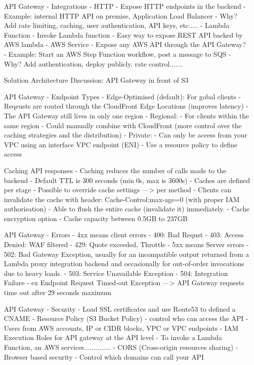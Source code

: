 API Gateway - Integrations
- HTTP
- Expose HTTP endpoints in the backend
- Example: internal HTTP API on premise, Application Load Balancer
- Why? Add rate limiting, caching, user authentication, API keys, etc.....
- Lambda Function
- Invoke Lambda function
- Easy way to expose REST API backed by AWS lambda
- AWS Service
- Expose any AWS API through the API Gateway?
- Example: Start an AWS Step Function workflow, post a message to SQS
- Why? Add authentication, deploy publicly. rate control.......

Solution Architecture Discussion: API Gateway in front of S3

API Gateway - Endpoint Types
- Edge-Optimised (default): For gobal clients
- Reqeusts are routed through the CloudFront Edge Locations (improves latency)
- The API Gateway still lives in only one region
- Regional:
- For clients within the same region
- Could manually combine with CloudFront (more control over the caching strategies and the distribution)
- Private:
- Can only be access from your VPC using an interface VPC endpoint (ENI)
- Use a resource policy to define access

Caching API responses
- Caching reduces the number of calls made to the backend
- Default TTL is 300 seconds (min 0s, max is 3600s)
- Caches are defined per stage
- Possible to override cache settings ---> per method
- Clients can invalidate the cache with header: Cache-Control:max-age=0 (with proper IAM authorisation)
- Able to flush the entire cache (invalidate it) immediately.
- Cache encryption option
- Cache capacity between 0.5GB to 237GB

API Gateway - Errors
- 4xx means client errors
- 400: Bad Requst
- 403: Access Denied: WAF filtered
- 429: Quote exceeded, Throttle
- 5xx means Server errors
- 502: Bad Gateway Exception, usually for an incompatible output returned from a Lambda proxy integration backend and occasionally for out-of-order invocations due to heavy loads.
- 503: Service Unavailable Exception
- 504: Integration Failure - ex Endpoint Request Timed-out Exception
---> API Gateway requests time out after 29 seconds maximum

API Gateway - Security
- Load SSL certificates and use Route53 to defined a CNAME
- Resource Policy (S3 Bucket Policy)
- control who can access the API
- Users from AWS accounts, IP or CIDR blocks, VPC or VPC endpoints
- IAM Execution Roles for API gateway at the API level
- To invoke a Lambda Function, an AWS services..............
- CORS (Cross-origin resources sharing)
- Browser based security
- Control which domains can call your API

